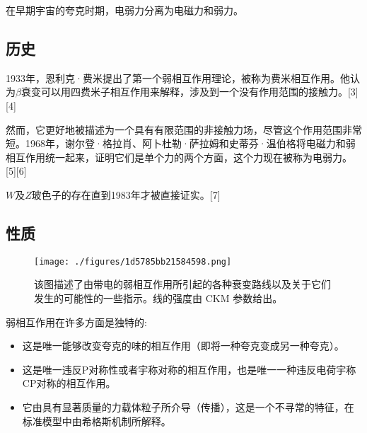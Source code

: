 在早期宇宙的夸克时期，电弱力分离为电磁力和弱力。

\subsection{历史}
1933年，恩利克·费米提出了第一个弱相互作用理论，被称为费米相互作用。他认为$\beta$衰变可以用四费米子相互作用来解释，涉及到一个没有作用范围的接触力。[3][4]

然而，它更好地被描述为一个具有有限范围的非接触力场，尽管这个作用范围非常短。1968年，谢尔登·格拉肖、阿卜杜勒·萨拉姆和史蒂芬·温伯格将电磁力和弱相互作用统一起来，证明它们是单个力的两个方面，这个力现在被称为电弱力。[5][6]

$W$及$Z$玻色子的存在直到1983年才被直接证实。[7]

\subsection{性质}
\begin{figure}[ht]
\centering
\texttt{[image: ./figures/1d5785bb21584598.png]}
\caption{该图描述了由带电的弱相互作用所引起的各种衰变路线以及关于它们发生的可能性的一些指示。线的强度由 CKM 参数给出。} \label{fig_RXHZY_2}
\end{figure}

弱相互作用在许多方面是独特的:
\begin{itemize}
\item 这是唯一能够改变夸克的味的相互作用（即将一种夸克变成另一种夸克）。
\item 这是唯一违反P对称性或者宇称对称的相互作用，也是唯一一种违反电荷宇称CP对称的相互作用。
\item 它由具有显著质量的力载体粒子所介导（传播），这是一个不寻常的特征，在标准模型中由希格斯机制所解释。
\end{itemize}


